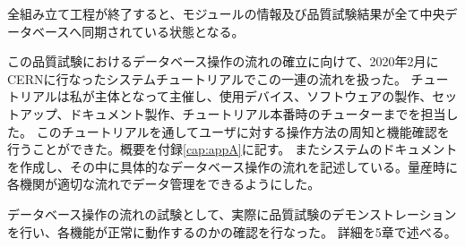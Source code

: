 全組み立て工程が終了すると、モジュールの情報及び品質試験結果が全て中央データベースへ同期されている状態となる。


この品質試験におけるデータベース操作の流れの確立に向けて、2020年2月にCERNに行なったシステムチュートリアルでこの一連の流れを扱った。
チュートリアルは私が主体となって主催し、使用デバイス、ソフトウェアの製作、セットアップ、ドキュメント製作、チュートリアル本番時のチューターまでを担当した。
このチュートリアルを通してユーザに対する操作方法の周知と機能確認を行うことができた。概要を付録\ref{cap:appA}に記す。
またシステムのドキュメント\cite{4-7}を作成し、その中に具体的なデータベース操作の流れを記述している。量産時に各機関が適切な流れでデータ管理をできるようにした。


データベース操作の流れの試験として、実際に品質試験のデモンストレーションを行い、各機能が正常に動作するのかの確認を行なった。
詳細を5章で述べる。

